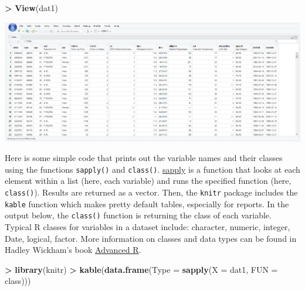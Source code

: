 \documentclass[
]{book}
\newenvironment{Shaded}{\begin{snugshade}}{\end{snugshade}}
\newcommand{\DataTypeTok}[1]{\textcolor[rgb]{0.13,0.29,0.53}{#1}}
\newcommand{\KeywordTok}[1]{\textcolor[rgb]{0.13,0.29,0.53}{\textbf{#1}}}
\newcommand{\NormalTok}[1]{#1}
\newcommand{\OperatorTok}[1]{\textcolor[rgb]{0.81,0.36,0.00}{\textbf{#1}}}
\newcommand{\StringTok}[1]{\textcolor[rgb]{0.31,0.60,0.02}{#1}}
\begin{document}
\begin{Shaded}
\begin{Highlighting}[]
\OperatorTok{>}\StringTok{ }\KeywordTok{View}\NormalTok{(dat1)}
\end{Highlighting}
\end{Shaded}

\includegraphics{images/View_data.png}

Here is some simple code that prints out the variable names and their classes using the functions \texttt{sapply()} and \texttt{class()}. \href{https://www.rdocumentation.org/packages/base/versions/current/topics/lapply}{sapply} is a function that looks at each element within a list (here, each variable) and runs the specified function (here, \texttt{class()}). Results are returned as a vector. Then, the \texttt{knitr} package includes the \texttt{kable} function which makes pretty default tables, especially for reports.
In the output below, the \texttt{class()} function is returning the class of each variable. Typical R classes for variables in a dataset include: character, numeric, integer, Date, logical, factor. More information on classes and data types can be found in Hadley Wickham's book \href{https://adv-r.hadley.nz/base-types.html}{Advanced R}.

\begin{Shaded}
\begin{Highlighting}[]
\OperatorTok{>}\StringTok{ }\KeywordTok{library}\NormalTok{(knitr)}
\OperatorTok{>}\StringTok{ }\KeywordTok{kable}\NormalTok{(}\KeywordTok{data.frame}\NormalTok{(}\DataTypeTok{Type =} \KeywordTok{sapply}\NormalTok{(}\DataTypeTok{X =}\NormalTok{ dat1, }\DataTypeTok{FUN =}\NormalTok{ class)))}
\end{Highlighting}
\end{Shaded}
\end{document}
